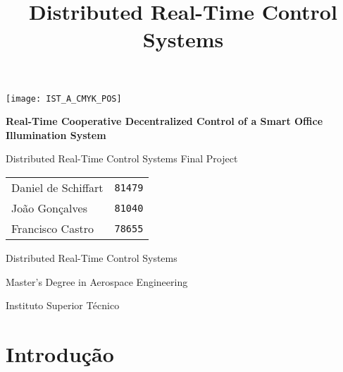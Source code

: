 \documentclass[english,palatino]{ist-report}
\title{Distributed Real-Time Control Systems}
\begin{document}
\begin{titlepage}

\begin{center}
	\vspace*{0.1\textheight}
	\texttt{[image: IST\_A\_CMYK\_POS]}
	
	\vspace*{0.1\textheight}
	{\huge\bfseries Real-Time Cooperative Decentralized Control of a Smart Office Illumination System}
	
	\vspace*{0.03\textheight}
	{\Large Distributed Real-Time Control Systems Final Project}
	
	\vspace*{43.5mm}
	{\Large \begin{tabular}{l r} Daniel de Schiffart & \texttt{81479} \\ João Gonçalves & \texttt{81040} \\ Francisco Castro & \texttt{78655}\end{tabular}}
	
	\vspace{\fill}
	{\large Distributed Real-Time Control Systems}
	
	\vspace*{0.01\textheight}
	{\Large Master's Degree in Aerospace Engineering}
	
	\vspace*{0.01\textheight}
	{\large Instituto Superior Técnico}
\end{center}

\end{titlepage}
\setcounter{page}{1}

{\hypersetup{linkcolor = black} \tableofcontents}

\section{Introdução}

\end{document}
